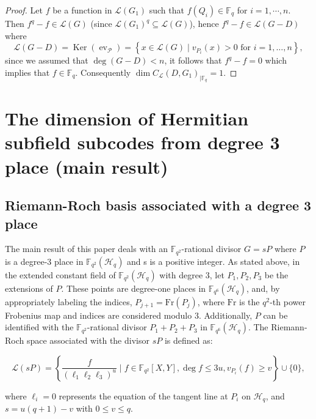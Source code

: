 \documentclass[a4paper]{amsart}
\theoremstyle{plain}
\theoremstyle{definition}
\theoremstyle{remark}
\newcommand{\calP}{\mathcal{P}}
\begin{document}
\begin{proof}
	Let $f$ be a function in $\mathscr{L}(G_1)$ such that $f(Q_i) \in \mathbb{F}_q$ for $i=1,\cdots,n$. Then $f^q -f \in \mathscr{L}(G)$ (since $\mathscr{L}(G_1)^q \subseteq \mathscr{L}(G)$), hence $f^q - f \in  \mathscr{L}(G-D)$ where
	\[\mathscr{L}(G-D) = \operatorname{Ker}\left(\operatorname{ev}_{\calP}\right)=\left\{x \in \mathscr{L}(G) \mid v_{P_i}(x)>0 \text { for } i=1, \ldots, n\right\} ,\]
	since we assumed that $\deg (G-D)<n$, it follows that $f^q -f =0$ which implies that $f \in \mathbb{F}_q$. Consequently $\dim C_{\mathcal{L}}(D,G_1)_{\mid \mathbb{F}_q}= 1$.
\end{proof}






\section{The dimension of Hermitian subfield subcodes from degree 3 place (main result)}
\subsection{Riemann-Roch basis associated with a degree 3 place}
The main result of this paper deals with an $\mathbb{F}_{q^2}$-rational divisor $G=sP$ where $P$ is a degree-3 place in $\mathbb{F}_{q^2}(\mathscr{H}_q)$ and s is a positive integer. As stated above, in the extended constant field of $\mathbb{F}_{q^2}(\mathscr{H}_q)$ with degree $3$, let $P_1, P_2, P_3$ be the extensions of $P$. These points are degree-one places in $\mathbb{F}_{q^6}(\mathscr{H}_q)$, and, by appropriately labeling the indices, $P_{j+1} = \text{Fr}(P_j)$, where $\text{Fr}$ is the $q^2$-th power Frobenius map and indices are considered modulo $3$. Additionally, $P$ can be identified with the $\mathbb{F}_{q^2}$-rational divisor $P_1+P_2+P_3$ in $\mathbb{F}_{q^6}(\mathscr{H}_q)$. The Riemann-Roch space associated with the divisor $sP$ \cite{korchmaros2013hermitian} is defined as:

\[
	\mathscr{L}(sP) = \left\{ \frac{f}{(\ell_1\ell_2\ell_3)^u} \mid f \in \mathbb{F}_{q^2}[X,Y], \deg f \leq 3u, v_{P_i}(f) \geq v \right\} \cup \{0\},
\]

where $\ell_i=0$ represents the equation of the tangent line at $P_i$ on $\mathscr{H}_q$, and $s = u(q+1) - v$ with $0 \leq v \leq q$.
\end{document}
